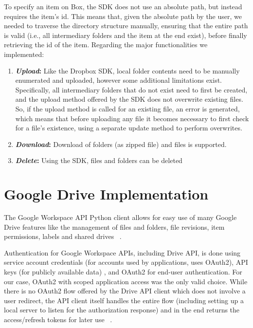 To specify an item on Box, the SDK does not use an absolute path, but instead requires the item's id. This means that, given the absolute path by the user, we needed to traverse the directory structure manually, ensuring that the entire path is valid (i.e., all intermediary folders and the item at the end exist), before finally retrieving the id of the item. Regarding the major functionalities we implemented: ~\cite{box_docs}


\begin{enumerate}
	\item \textbf{\textit{Upload}:} Like the Dropbox SDK, local folder contents need to be manually enumerated and uploaded, however some additional limitations exist. Specifically, all intermediary folders that do not exist need to first be created, and the upload method offered by the SDK does not overwrite existing files. So, if the upload method is called for an existing file, an error is generated, which means that before uploading any file it becomes necessary to first check for a file's existence, using a separate update method to perform overwrites.
	
	\item \textbf{\textit{Download}:} Download of folders (as zipped file) and files is supported.
	
	\item \textbf{\textit{Delete}:} Using the SDK, files and folders can be deleted
\end{enumerate}


\section{Google Drive Implementation}
The Google Workspace API Python client allows for easy use of many Google Drive features like the management of files and folders, file revisions, item permissions, labels and shared drives ~\cite{drive_docs}. 

Authentication for Google Workspace APIs, including Drive API, is done using service account credentials (for accounts used by applications, uses OAuth2), API keys (for publicly available data) , and OAuth2 for end-user authentication. For our case, OAuth2 with scoped application access was the only valid choice. While there is no OAuth2 flow offered by the Drive API client which does not involve a user redirect, the API client itself handles the entire flow (including setting up a local server to listen for the authorization response) and in the end returns the access/refresh tokens for later use ~\cite{drive_auth}.  

